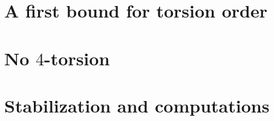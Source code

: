 \documentclass[a4paper, 12pt, pdftex,reqno
]{amsart}
\theoremstyle{definition}
\begin{document}


\section{A first bound for torsion order} \label{s:4tor}




\section{No $4$-torsion}\label{sec:no4tor}



\section{Stabilization and computations}\label{sec:stab}






 
\end{document}
